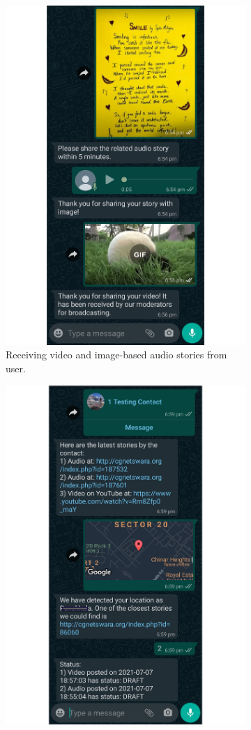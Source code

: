 \begin{figure}[t]
    \centering
    \begin{subfigure}[b]{0.48\textwidth}
        \centering
        \includegraphics[height=\textwidth]{images/receive_image_video_PDF.pdf}
    \caption{Receiving video and image-based audio stories from user.}
    \label{fig:video_image}
    \end{subfigure}
    \hfill
    \begin{subfigure}[b]{0.48\textwidth}
         \centering
         \includegraphics[height=\textwidth]{images/send_location_ccard_PDF.pdf}

\end{subfigure}
\end{figure}
